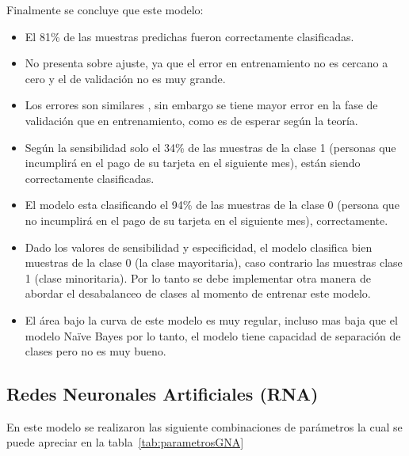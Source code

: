 \documentclass[conference]{IEEEtran}
\begin{document}
Finalmente se concluye que este modelo:
\begin{itemize}
\item El 81\% de las muestras predichas fueron correctamente clasificadas.
\item No presenta sobre ajuste, ya que el error en entrenamiento no es cercano a cero y el de validación no es muy grande.
\item Los errores son similares , sin embargo se tiene mayor error en la fase de validación que en entrenamiento, como es de esperar según la teoría.
\item Según la sensibilidad solo el 34\% de las muestras de la clase 1 (personas que incumplirá en el pago de su tarjeta en el siguiente mes), están siendo correctamente clasificadas.
\item El modelo esta clasificando el 94\% de las muestras de la clase 0 (persona que no incumplirá en el pago de su tarjeta en el siguiente mes), correctamente.
\item Dado los valores de sensibilidad y especificidad, el modelo clasifica bien muestras de la clase 0 (la clase mayoritaria), caso contrario las muestras clase 1 (clase minoritaria). Por lo tanto se debe implementar otra manera de abordar el desabalanceo de clases al momento de entrenar este modelo.
\item El área bajo la curva de este modelo es muy regular, incluso mas baja que el modelo Naïve Bayes por lo tanto, el modelo  tiene capacidad de separación de clases pero no es muy bueno.
\end{itemize}
\subsection{Redes Neuronales Artificiales (RNA)}
En este modelo se realizaron las siguiente combinaciones de parámetros la cual se puede apreciar en la tabla~\ref{tab:parametrosGNA}\hfill\\
\end{document}

